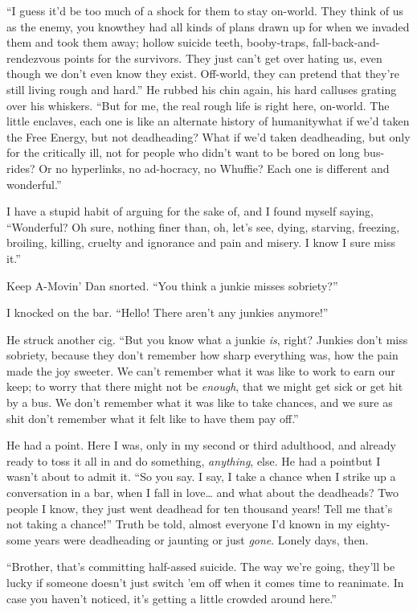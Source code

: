 “I guess it'd be too much of a shock for them to stay on-world.
They think of us as the enemy, you know{\dash}they had all kinds of plans
drawn up for when we invaded them and took them away; hollow
suicide teeth, booby-traps, fall-back-and-rendezvous points for the
survivors. They just can't get over hating us, even though we don't
even know they exist. Off-world, they can pretend that they're
still living rough and hard.” He rubbed his chin again, his hard
calluses grating over his whiskers. “But for me, the real rough
life is right here, on-world. The little enclaves, each one is like
an alternate history of humanity{\dash}what if we'd taken the Free
Energy, but not deadheading? What if we'd taken deadheading, but
only for the critically ill, not for people who didn't want to be
bored on long bus-rides? Or no hyperlinks, no ad-hocracy, no
Whuffie? Each one is different and wonderful.”

I have a stupid habit of arguing for the sake of, and I found
myself saying, “Wonderful? Oh sure, nothing finer than, oh, let's
see, dying, starving, freezing, broiling, killing, cruelty and
ignorance and pain and misery. I know I sure miss it.”

Keep A-Movin' Dan snorted. “You think a junkie misses sobriety?”

I knocked on the bar. “Hello! There aren't any junkies anymore!”

He struck another cig. “But you know what a junkie \emph{is},
right? Junkies don't miss sobriety, because they don't remember how
sharp everything was, how the pain made the joy sweeter. We can't
remember what it was like to work to earn our keep; to worry that
there might not be \emph{enough}, that we might get sick or get hit
by a bus. We don't remember what it was like to take chances, and
we sure as shit don't remember what it felt like to have them pay
off.”

He had a point. Here I was, only in my second or third adulthood,
and already ready to toss it all in and do something,
\emph{anything}, else. He had a point{\dash}but I wasn't about to admit
it. “So you say. I say, I take a chance when I strike up a
conversation in a bar, when I fall in love… and what about the
deadheads? Two people I know, they just went deadhead for ten
thousand years! Tell me that's not taking a chance!” Truth be told,
almost everyone I'd known in my eighty-some years were deadheading
or jaunting or just \emph{gone}. Lonely days, then.

“Brother, that's committing half-assed suicide. The way we're
going, they'll be lucky if someone doesn't just switch 'em off when
it comes time to reanimate. In case you haven't noticed, it's
getting a little crowded around here.”


